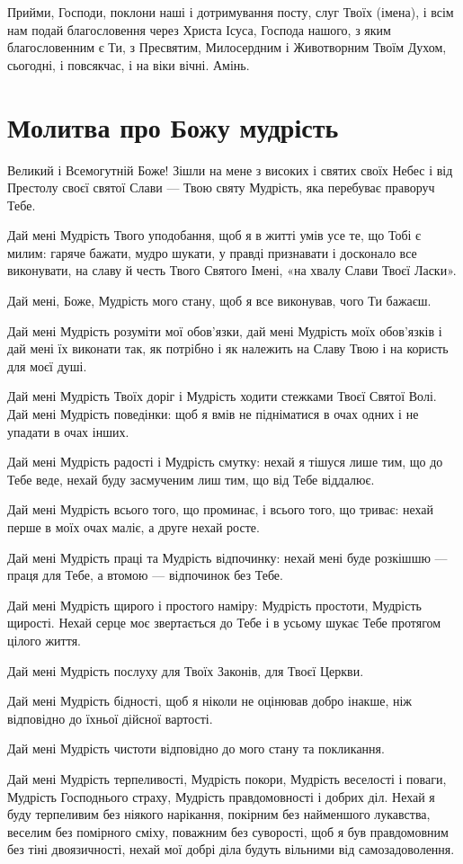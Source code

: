 \documentclass[chapters.tex]{subfiles}
\begin{document}
Прийми, Господи, поклони наші і дотримування посту, слуг Твоїх (імена), і всім нам подай благословення через Христа Ісуса, Господа нашого, з яким благословенним є Ти, з Пресвятим, Милосердним і Животворним Твоїм Духом, сьогодні, і повсякчас, і на віки вічні. Амінь.

\section{Молитва про Божу мудрість}
Великий і Всемогутній Боже! Зішли на мене з високих і святих своїх Небес і від Престолу своєї святої Слави — Твою святу Мудрість, яка перебуває праворуч Тебе.

Дай мені Мудрість Твого уподобання, щоб я в житті умів усе те, що Тобі є милим: гаряче бажати, мудро шукати, у правді признавати і досконало все виконувати, на славу й честь Твого Святого Імені, «на хвалу Слави Твоєї Ласки».

Дай мені, Боже, Мудрість мого стану, щоб я все виконував, чого Ти бажаєш.

Дай мені Мудрість розуміти мої обов’язки, дай мені Мудрість моїх обов’язків і дай мені їх виконати так, як потрібно і як належить на Славу Твою і на користь для моєї душі.

Дай мені Мудрість Твоїх доріг і Мудрість ходити стежками Твоєї Святої Волі. Дай мені Мудрість поведінки: щоб я вмів не підніматися в очах одних і не упадати в очах інших.

Дай мені Мудрість радості і Мудрість смутку: нехай я тішуся лише тим, що до Тебе веде, нехай буду засмученим лиш тим, що від Тебе віддалює.

Дай мені Мудрість всього того, що проминає, і всього того, що триває: нехай перше в моїх очах маліє, а друге нехай росте.

Дай мені Мудрість праці та Мудрість відпочинку: нехай мені буде розкішшю — праця для Тебе, а втомою — відпочинок без Тебе.

Дай мені Мудрість щирого і простого наміру: Мудрість простоти, Мудрість щирості. Нехай серце моє звертається до Тебе і в усьому шукає Тебе протягом цілого життя.

Дай мені Мудрість послуху для Твоїх Законів, для Твоєї Церкви.

Дай мені Мудрість бідності, щоб я ніколи не оцінював добро інакше, ніж відповідно до їхньої дійсної вартості.

Дай мені Мудрість чистоти відповідно до мого стану та покликання.

Дай мені Мудрість терпеливості, Мудрість покори, Мудрість веселості і поваги, Мудрість Господнього страху, Мудрість правдомовності і добрих діл. Нехай я буду терпеливим без ніякого нарікання, покірним без найменшого лукавства, веселим без помірного сміху, поважним без суворості, щоб я був правдомовним без тіні двоязичності, нехай мої добрі діла будуть вільними від самозадоволення.
\end{document}
